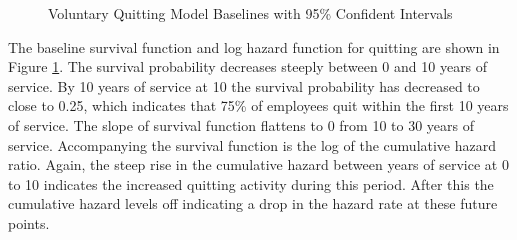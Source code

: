 \documentclass[12pt,letterpaper]{article}
\begin{document}
\begin{figure}[h!]
	\centering
	\caption{Voluntary Quitting Model Baselines with 95\% Confident Intervals}
	\label{fig:vqbasepred}
\end{figure}
The baseline survival function and log hazard function for quitting are shown in Figure \ref{fig:vqbasepred}. The survival probability decreases steeply between 0 and 10 years of service. By 10 years of service at 10 the survival probability has decreased to close to 0.25, which indicates that 75\% of employees quit within the first 10 years of service.  The slope of survival function flattens to 0 from 10 to 30 years of service.  Accompanying the survival function is the log of the cumulative hazard ratio.  Again, the steep rise in the cumulative hazard between years of service at 0 to 10 indicates the increased quitting activity during this period.  After this the cumulative hazard levels off indicating a drop in the hazard rate at these future points.
\end{document}
